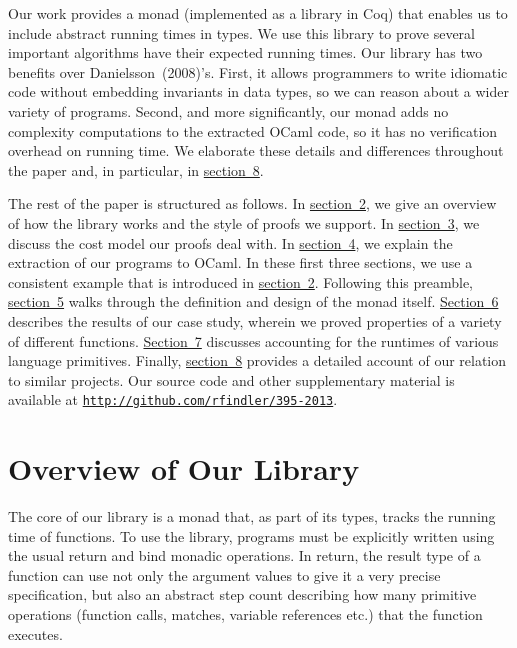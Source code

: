 \documentclass{llncs}
\newcommand{\sectionNewpage}{}
\newcommand{\ChapRef}[2]{\SecRef{#1}{#2}}
\newcommand{\SecRef}[2]{section~#1}
\newcommand{\ChapRefUC}[2]{\SecRefUC{#1}{#2}}
\newcommand{\SecRefUC}[2]{Section~#1}
\newcommand{\ChapRefLocal}[3]{\hyperref[#1]{\ChapRef{#2}{#3}}}
\newcommand{\ChapRefLocalUC}[3]{\hyperref[#1]{\ChapRefUC{#2}{#3}}}
\newcommand{\Scribtexttt}[1]{{\texttt{#1}}}
\let\SOriginalthesubsection\thesubsection
\newcommand{\Ssection}[2]{\section[#1]{#2}\let\thesubsection\SOriginalthesubsection}
\newcommand{\Snolinkurl}[1]{\nolinkurl{#1}}
\begin{document}
Our work provides a monad (implemented as a library in Coq) that
enables us to include abstract running times in types. We use this
library to prove several important algorithms have their expected
running times.  Our library has two benefits over
Danielsson~(2008){'}s.
First, it allows programmers
to write idiomatic code without embedding invariants in data types,
so we can reason about a wider variety of programs. Second, and more
significantly, our monad adds no complexity
computations to the extracted OCaml code, so it has no verification
overhead on running time.  We elaborate these details and differences
throughout the paper and, in particular, in
\ChapRefLocal{t:x28part_x22secx3arelatedx2dworkx22x29}{8}{Related Work}.

The rest of the paper is structured as follows. In
\ChapRefLocal{t:x28part_x22secx3ainsertx22x29}{2}{Overview of Our Library}, we give an overview of how the library works
and the style of proofs we support. In \ChapRefLocal{t:x28part_x22secx3arunningx2dtimex22x29}{3}{Implicit Running Times}, we
discuss the cost model our proofs deal with. In
\ChapRefLocal{t:x28part_x22secx3aextractx2dinsertx22x29}{4}{Extracting the \Scribtexttt{insert} Function}, we explain the extraction of our
programs to OCaml. In these first three sections, we use a consistent
example that is introduced in \ChapRefLocal{t:x28part_x22secx3ainsertx22x29}{2}{Overview of Our Library}. Following this
preamble, \ChapRefLocal{t:x28part_x22secx3amonadx22x29}{5}{The Monad} walks through the definition and design
of the monad itself. \ChapRefLocalUC{t:x28part_x22secx3acasex2dstudyx22x29}{6}{Case Study} describes the results
of our case study, wherein we proved properties of a variety of
different functions. \ChapRefLocalUC{t:x28part_x22secx3asub1x22x29}{7}{Accounting for Language Primitives} discusses accounting for
the runtimes of various language primitives. Finally,
\ChapRefLocal{t:x28part_x22secx3arelatedx2dworkx22x29}{8}{Related Work} provides a detailed account of our relation
to similar projects. Our source code and other supplementary material
is available at \href{http://github.com/rfindler/395-2013}{\Snolinkurl{http://github.com/rfindler/395-2013}}.

\sectionNewpage

\Ssection{Overview of Our Library}{Overview of Our Library}\label{t:x28part_x22secx3ainsertx22x29}

The core of our library is a monad that, as part of its types, tracks
the running time of functions.  To use the library, programs must be
explicitly written using the usual return and bind monadic
operations. In return, the result type of a function can use not only
the argument values to give it a very precise specification, but also
an abstract step count describing how many primitive
operations (function calls, matches, variable references etc.) that
the function executes.
\end{document}

